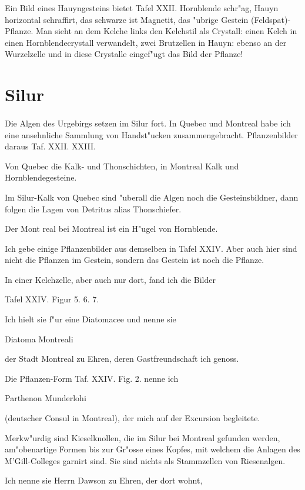 \documentclass[a4paper, 11pt, oneside, german]{article}
\begin{document}
Ein Bild eines Hauyngesteins bietet Tafel XXII. Hornblende schr"ag, Hauyn horizontal schraffirt, das schwarze ist Magnetit, das "ubrige Gestein (Feldspat)-Pflanze. Man sieht an dem Kelche links den Kelchstil als Crystall: einen Kelch in einen Hornblendecrystall verwandelt, zwei Brutzellen in Hauyn: ebenso an der Wurzelzelle und in diese Crystalle eingef"ugt das Bild der Pflanze!
\clearpage
\section{Silur}
\paragraph{}
Die Algen des Urgebirgs setzen im Silur fort. In Quebec und Montreal habe ich eine ansehnliche Sammlung von Handst"ucken zusammengebracht. Pflanzenbilder daraus Taf. XXII. XXIII.

Von Quebec die Kalk- und Thonschichten, in Montreal Kalk und Hornblendegesteine.

Im Silur-Kalk von Quebec sind "uberall die Algen noch die Gesteinsbildner, dann folgen die Lagen von Detritus alias Thonschiefer.

Der Mont real bei Montreal ist ein H"ugel von Hornblende.

Ich gebe einige Pflanzenbilder aus demselben in Tafel XXIV. Aber auch hier sind nicht die Pflanzen im Gestein, sondern das Gestein ist noch die Pflanze.

In einer Kelchzelle, aber auch nur dort, fand ich die Bilder

Tafel XXIV. Figur 5. 6. 7.

Ich hielt sie f"ur eine Diatomacee und nenne sie

Diatoma Montreali

der Stadt Montreal zu Ehren, deren Gastfreundschaft ich genoss.

Die Pflanzen-Form Taf. XXIV. Fig. 2. nenne ich

Parthenon Munderlohi

(deutscher Consul in Montreal), der mich auf der Excursion begleitete.

Merkw"urdig sind Kieselknollen, die im Silur bei Montreal gefunden werden, am"obenartige Formen bis zur Gr"osse eines Kopfes, mit welchem die Anlagen des M'Gill-Colleges garnirt sind. Sie sind nichts als Stammzellen von Riesenalgen.

Ich nenne sie Herrn Dawson zu Ehren, der dort wohnt,
\end{document}
